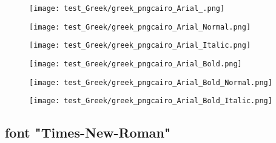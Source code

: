 \documentclass{ltjsarticle}
\begin{document}
			\begin{figure}[ht]
				\centering
				\begin{minipage}{0.3\columnwidth}
					\texttt{[image: test\_Greek/greek\_pngcairo\_Arial\_.png]}
				\end{minipage}
				\begin{minipage}{0.3\columnwidth}
					\texttt{[image: test\_Greek/greek\_pngcairo\_Arial\_Normal.png]}
				\end{minipage}
				\begin{minipage}{0.3\columnwidth}
					\texttt{[image: test\_Greek/greek\_pngcairo\_Arial\_Italic.png]}
				\end{minipage}
				\begin{minipage}{0.3\columnwidth}
					\texttt{[image: test\_Greek/greek\_pngcairo\_Arial\_Bold.png]}
				\end{minipage}
				\begin{minipage}{0.3\columnwidth}
					\texttt{[image: test\_Greek/greek\_pngcairo\_Arial\_Bold\_Normal.png]}
				\end{minipage}
				\begin{minipage}{0.3\columnwidth}
					\texttt{[image: test\_Greek/greek\_pngcairo\_Arial\_Bold\_Italic.png]}
				\end{minipage}
			\end{figure}
			\clearpage%
		
		\subsection{font "Times-New-Roman"}
\end{document}
